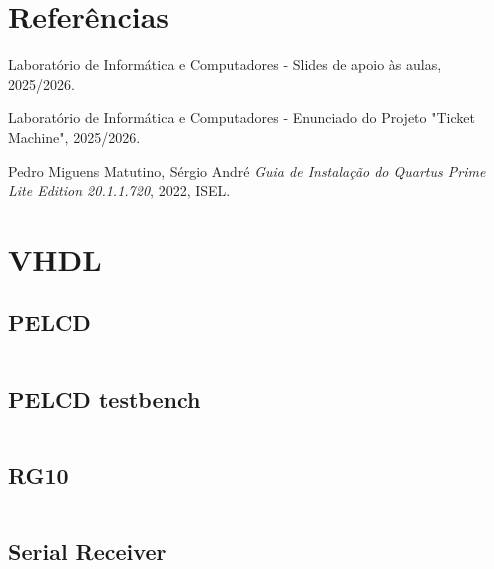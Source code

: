 \documentclass[10pt,a4paper,twocolumn]{article}
\begin{document}
\onecolumn
\newpage
\section*{Referências}
\begin{thebibliography}{9}
Laboratório de Informática e Computadores - Slides de apoio às aulas, 2025/2026.

Laboratório de Informática e Computadores - Enunciado do Projeto "Ticket Machine", 2025/2026.

Pedro Miguens Matutino, Sérgio André \emph{Guia de Instalação do Quartus Prime Lite Edition 20.1.1.720}, 2022, ISEL.
\end{thebibliography}

\clearpage
\appendix
\section{VHDL}

\subsection{PELCD}
\label{sec:PELCD_VHDL}
\begin{minipage}{\linewidth}
\footnotesize
\inputminted{vhdl}{vhdl/PELCD.vhd}
\label{vhdl:PELCD}
\end{minipage}

\subsection{PELCD testbench}
\label{sec:PELCD_tb_VHDL}
\begin{minipage}{\linewidth}
\footnotesize
\inputminted{vhdl}{vhdl/PELCD_tb.vhd}
\label{vhdl:PELCD_tb}
\end{minipage}

\subsection{RG10}
\label{sec:RG10_VHDL}
\begin{minipage}{\linewidth}
\footnotesize
\inputminted{vhdl}{vhdl/RG10.vhd}
\label{vhdl:RG10}
\end{minipage}

\subsection{Serial Receiver}
\label{sec:SerialReceiver_VHDL}
\begin{minipage}{\linewidth}
\footnotesize
\inputminted{vhdl}{vhdl/SerialReceiver.vhd}
\label{vhdl:SerialReceiver}
\end{minipage}
\end{document}
